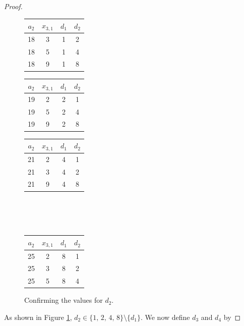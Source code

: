 \documentclass[10pt, reqno]{amsart}
\theoremstyle{definition}
\theoremstyle{plain}
\begin{document}
\begin{proof}
\begin{figure}[hbt!]
\centering
\renewcommand{\arraystretch}{1.5}
\begin{tabular}{|c|c|c|c|}\hline
  $a_2$ &  $x_{3,1}$ & $d_1$ & $d_2$ \\  \hline  
   18   &   3  &  1  & 2 \\ \hline
   18  &    5  &  1  & 4 \\  \hline
   18  &    9  &  1  & 8  \\ \hline 
\end{tabular}
\hspace{0.15in}
\renewcommand{\arraystretch}{1.5}
\begin{tabular}{|c|c|c|c|}\hline
  $a_2$ &  $x_{3,1}$ & $d_1$ & $d_2$ \\  \hline  
   19   &   2  &  2  & 1 \\ \hline
   19  &    5  &  2  & 4 \\  \hline
   19  &    9  &  2  & 8  \\ \hline 
\end{tabular}
\hspace{0.15in}
\renewcommand{\arraystretch}{1.5}
\begin{tabular}{|c|c|c|c|}\hline
  $a_2$ &  $x_{3,1}$ & $d_1$ & $d_2$ \\  \hline  
   21   &   2  &  4  & 1 \\ \hline
   21  &    3  &  4  & 2 \\  \hline
   21  &    9  &  4  & 8  \\ \hline 
\end{tabular}
\hspace{2in}\\
\hspace{2in}\\
\hspace{2in}\\
\begin{tabular}{|c|c|c|c|}\hline
  $a_2$ &  $x_{3,1}$ & $d_1$ & $d_2$ \\  \hline  
   25   &   2  &  8  & 1 \\ \hline
   25  &    3  &  8  & 2 \\  \hline
   25  &    5  &  8  & 4  \\ \hline 
\end{tabular}
\caption{Confirming the values for $d_2$.}\label{confirmingd2vertbal}
\end{figure}
As shown in Figure \ref{confirmingd2vertbal}, $d_2\in\{ 1,\, 2,\, 4,\, 8\}\setminus \{d_1\}$. 
We now define $d_3$ and $d_4$ by

\end{proof}
\end{document}
